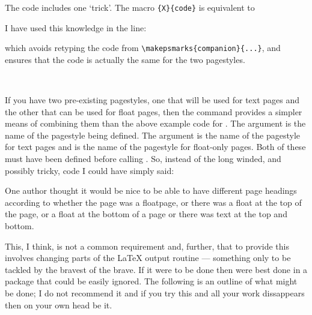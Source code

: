 \begin{plainlist}
    The code includes one `trick'. The macro \cmd{\makepsmarks}\verb?{X}{code}?
is equivalent to
\begin{lcode}
\newcommand{\Xpshook}{code}
\end{lcode}
I have used this knowledge in the line:
\begin{lcode}
\end{lcode}
which avoids retyping the code from 
\verb?\makepsmarks{companion}{...}?,
and ensures that the code is actually the same for the two pagestyles.

\begin{syntax}
\cmd{\mergepagefloatstyle} \\
\end{syntax}
    If you have two pre-existing pagestyles, one that will be used for
text pages and the other that can be used for float pages, then the
\cmd{\mergepagefloatstyle} command provides a simpler means of 
combining
them than the above example code for . The argument
 is the name of the pagestyle being defined. The
argument 
is the name of the pagestyle for text pages and  is the
name of the pagestyle for float-only pages. Both of these must have been 
defined before calling \cmd{\mergepagefloatstyle}. So, instead of the long
winded, and possibly tricky, code I could have simply said:
\begin{lcode}
\end{lcode}


    One author thought it would be nice to be able to have different 
page headings according
to whether the page was a floatpage, or there was a float at the top of 
the page, or a float at the bottom of a page or there was text at the 
top and bottom.

    This, I think, is not a common requirement and, further, that to provide 
this involves changing parts of the LaTeX output routine --- something only
to be tackled by the bravest of the brave. If it were to be done then were
best done in a package that could be easily ignored. The following is an
outline of what might be done; I do not recommend it and if you try this 
and all your work dissappears then on your own head be it.

\begin{lcode}
\newif\iffloatattop
  \floatattopfalse
\newif\iffloatatbot
  \floatatbotfalse


\end{lcode}
\end{plainlist}
